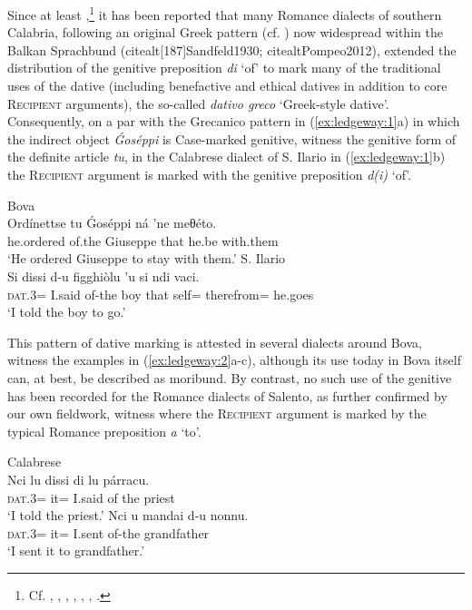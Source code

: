 \documentclass[output=paper,modfonts,nonflat,colorlinks,citecolor=brown]{langsci/langscibook}
\begin{document}
Since at least \citet[§639]{Rohlfs1969},\footnote{Cf. \citet[§639]{Rohlfs1969}, \citet[232-233]{Trumper2003}, \citet[209]{Vincent1997}, \citet[243, 427-429]{Katsoyannou1995}, \citet[54-55]{Katsoyannou2001}, \citet[140-141]{Ralli2006}, \citet[192-196]{Ledgeway2013}.} it has been reported that many Romance dialects of southern Calabria, following an original Greek pattern (cf. \citealt[160]{Joseph1990}) now widespread within the Balkan Sprachbund (citealt[187]{Sandfeld1930}; citealt{Pompeo2012}), extended the distribution of the genitive preposition \textit{di} ‘of’ to mark many of the traditional uses of the dative (including benefactive and ethical datives in addition to core \textsc{Recipient} arguments), the so-called \textit{dativo greco} `Greek-style dative'. Consequently, on a par with the Grecanico pattern in (\ref{ex:ledgeway:1}a) in which the indirect object \textit{Ǵoséppi} is Case-marked genitive, witness the genitive form of the definite article \textit{tu}, in the Calabrese dialect of S. Ilario in (\ref{ex:ledgeway:1}b) the \textsc{Recipient} argument is marked with the genitive preposition \textit{d(i)} ‘of’. 

\ea\label{ex:ledgeway:1}
\ea  Bova  \\
  \gll Ordínettse  tu  Ǵoséppi  ná  ’ne  meθéto.\\  
    he.ordered  of.the  Giuseppe  that  he.be  with.them\\
    \glt `He ordered Giuseppe to stay with them.'
  \ex S. Ilario\\
    \gll Si  dissi  d-u  figghiòlu  ’u  si  ndi  vaci.\\ 
    \textsc{dat}.3=  I.said  of-the  boy  that  self=  therefrom=  he.goes \\
    \glt `I told the boy to go.'
    \z
    \z
    

This pattern of dative marking is attested in several dialects around Bova, witness the examples in (\ref{ex:ledgeway:2}a-c), although its use today in Bova itself can, at best, be described as moribund. By contrast, no such use of the genitive has been recorded for the Romance dialects of Salento, as further confirmed by our own fieldwork, witness  where the \textsc{Recipient} argument is marked by the typical Romance preposition \textit{a} ‘to’.

\ea\label{ex:ledgeway:2}
Calabrese  \\
\ea
	\gll Nci  lu  dissi  di  lu  párracu.\\
    \textsc{dat}.3=   it=  I.said  of  the  priest\\
    \glt `I told the priest.'
 \ex \gll Nci  u  mandai  d-u  nonnu.  \\
    \textsc{dat}.3=  it=  I.sent  of-the  grandfather\\
    \glt `I sent it to grandfather.'
    
\end{document}
